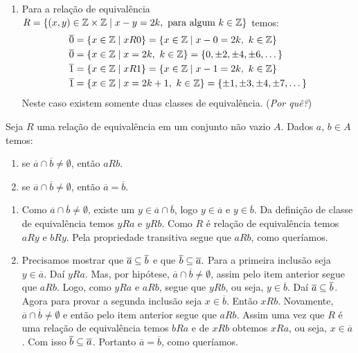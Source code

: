 \begin{exemplos}
\begin{enumerate}[label={\arabic*})]
        \item Para a relação de equivalência $R = \{(x,y)\in \mathbb{Z} \times \mathbb{Z} \mid x - y = 2k, \mbox{ para algum } k \in \mathbb{Z}\}$ temos:
        \begin{align*}
            \overline{0} &= \{x \in \mathbb{Z} \mid xR0 \} = \{x \in \mathbb{Z} \mid x - 0 = 2k,\ k \in \mathbb{Z}\} \\
            \overline{0} &= \{x \in \mathbb{Z} \mid x = 2k,\ k \in \mathbb{Z}\} = \{0, \pm 2, \pm 4, \pm 6, \dots\}\\
            \overline{1} &= \{x \in \mathbb{Z} \mid xR1 \} = \{x \in \mathbb{Z} \mid x - 1 = 2k,\ k \in \mathbb{Z}\} \\
            \overline{1} &= \{x \in \mathbb{Z} \mid x = 2k + 1,\ k \in \mathbb{Z}\} = \{\pm 1, \pm 3, \pm 4, \pm 7, \dots\}\\
        \end{align*}
        Neste caso existem somente duas classes de equivalência. (\textit{Por quê?})
    \end{enumerate}
\end{exemplos}

\begin{proposicao}
    Seja $R$ uma relação de equivalência em um conjunto não vazio $A$. Dados $a$, $b \in A$ temos:
    \begin{enumerate}[label={\roman*})]
        \item se $\overline{a} \cap \overline{b} \ne \emptyset$, então $aRb$.
        \item se  $\overline{a} \cap \overline{b} \neq \emptyset$, então $\overline{a} = \overline{b}$.
    \end{enumerate}
\end{proposicao}
\begin{prova}
    \begin{enumerate}[label={\roman*})]
        \item Como  $\overline{a} \cap \overline{b} \ne \emptyset$, existe um $y \in \overline{a} \cap \overline{b}$, logo $y \in \overline{a}$ e $y \in \overline{b}$. Da definição de classe de equivalência temos $yRa$ e $yRb$. Como $R$ é relação de equivalência temos $aRy$ e $bRy$. Pela propriedade transitiva segue que $aRb$, como queríamos.

        \item Precisamos mostrar que $\overline{a} \subseteq \overline{b}$ e que $\overline{b} \subseteq \overline{a}.$ Para a primeira inclusão seja $y \in \overline{a}$. Daí $yRa$. Mas, por hipótese, $\overline{a}\cap\overline{b}\neq\emptyset$, assim pelo item anterior segue que $aRb$. Logo, como $yRa$ e $aRb$, segue que $yRb$, ou seja, $y \in \overline{b}$. Daí $\overline{a}\subseteq\overline{b}$. Agora para provar a segunda inclusão seja $x \in \overline{b}$. Então $xRb$. Novamente, $\overline{a} \cap \overline{b} \ne \emptyset$ e então pelo item anterior segue que $aRb$. Assim uma vez que $R$ é uma relação de equivalência temos $bRa$ e de $xRb$ obtemos $xRa$, ou seja, $x \in \overline{a}$. Com isso $\overline{b} \subseteq \overline{a}$. Portanto $\overline{a} = \overline{b}$, como queríamos.
    \end{enumerate}
\end{prova}

